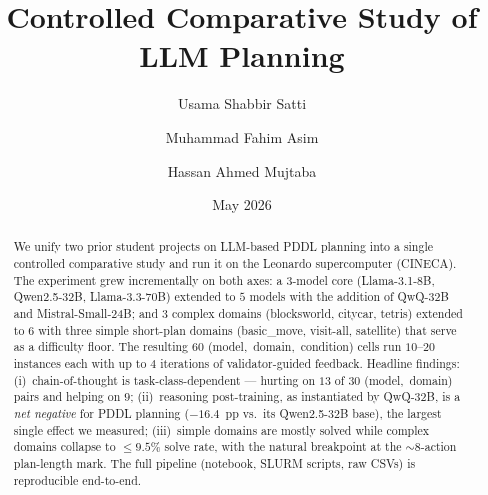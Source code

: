 \documentclass[11pt,a4paper]{article}
\title{Controlled Comparative Study of LLM Planning}
\author{Usama Shabbir Satti \and Muhammad Fahim Asim \and Hassan Ahmed Mujtaba}
\date{May 2026}
\begin{document}
\maketitle

\begin{abstract}
\noindent
We unify two prior student projects on LLM-based PDDL planning into a
single controlled comparative study and run it on the Leonardo
supercomputer (CINECA). The experiment grew incrementally on both
axes: a $3$-model core (Llama-3.1-8B, Qwen2.5-32B, Llama-3.3-70B)
extended to $5$ models with the addition of QwQ-32B and
Mistral-Small-24B; and $3$ complex domains
(blocksworld, citycar, tetris) extended to $6$ with three simple
short-plan domains (basic\_move, visit-all, satellite) that serve as
a difficulty floor. The resulting $60$ \mbox{(model, domain, condition)}
cells run $10$--$20$ instances each with up to $4$ iterations of
validator-guided feedback. Headline findings:
(i)~chain-of-thought is task-class-dependent --- hurting on $13$ of
$30$ \mbox{(model, domain)} pairs and helping on $9$;
(ii)~reasoning post-training, as instantiated by QwQ-32B, is a
\emph{net negative} for PDDL planning ($-16.4$~pp vs.\ its Qwen2.5-32B
base), the largest single effect we measured;
(iii)~simple domains are mostly solved while complex domains collapse
to $\leq 9.5\%$ solve rate, with the natural breakpoint at the
$\sim$$8$-action plan-length mark.
The full pipeline (notebook, SLURM scripts, raw CSVs) is reproducible
end-to-end.
\end{abstract}






\end{document}
